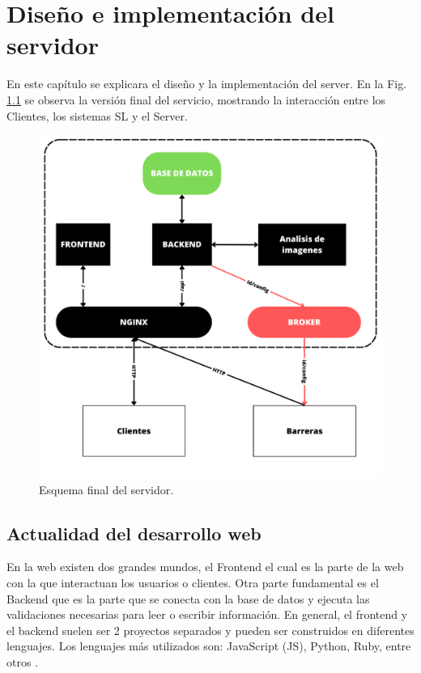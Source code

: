 \chapter{Diseño e implementación del servidor}

En este capítulo se explicara el diseño y la implementación del server. En la Fig. \ref{fig:server-final} se observa la versión final del servicio, mostrando la interacción entre los Clientes, los sistemas SL y el Server.

\begin{figure}
    \centering
    \includegraphics[width=\textwidth]{imgs/server-esquema.png}
    \caption{Esquema final del servidor.}
    \label{fig:server-final}
\end{figure}

\section{Actualidad del desarrollo web}

En la web existen dos grandes mundos, el Frontend el cual es la parte de la web con la que interactuan los usuarios o clientes. Otra parte fundamental es el Backend que es la parte que se conecta con la base de datos y ejecuta las validaciones necesarias para leer o escribir información. En general, el frontend y el backend suelen ser 2 proyectos separados y pueden ser construidos en diferentes lenguajes. Los lenguajes más utilizados son: JavaScript (JS), Python, Ruby, entre otros \cite{presta_10_2021}.

